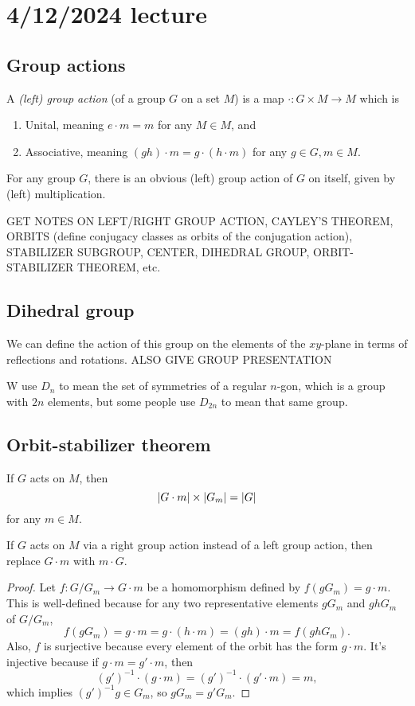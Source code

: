\documentclass[class=article, crop=false]{standalone}
\begin{document}
\section{4/12/2024 lecture}

\subsection{Group actions}
A \emph{(left) group action} (of a group $G$ on a set $M$) is a map $\cdot: G \times M \rightarrow M$ which is
\begin{enumerate}
    \item Unital, meaning $e \cdot m = m$ for any $M \in M$, and
    \item Associative, meaning $(gh)\cdot m = g \cdot (h \cdot m)$ for any $g \in G, m \in M$.
\end{enumerate}
For any group $G$, there is an obvious (left) group action of $G$ on itself, given by (left) multiplication.

GET NOTES ON LEFT/RIGHT GROUP ACTION, CAYLEY'S THEOREM, ORBITS (define conjugacy classes as orbits of the conjugation action), STABILIZER SUBGROUP, CENTER, DIHEDRAL GROUP, ORBIT-STABILIZER THEOREM, etc.

\subsection{Dihedral group}
We can define the action of this group on the elements of the $xy$-plane in terms of reflections and rotations. ALSO GIVE GROUP PRESENTATION
\begin{note}
    W use $D_n$ to mean the set of symmetries of a regular $n$-gon, which is a group with $2n$ elements, but some people use $D_{2n}$ to mean that same group.
\end{note}

\subsection{Orbit-stabilizer theorem}
\begin{thm}
    If $G$ acts on $M$, then
    \[ \left\lvert G \cdot m \right\rvert \times \left\lvert G_m \right\rvert = \left\lvert G \right\rvert \]
    for any $m \in M$.
    \par
    If $G$ acts on $M$ via a right group action instead of a left group action, then replace $G \cdot m$ with $m \cdot G$.
\end{thm}
\begin{proof}
    Let $f: G/G_m \rightarrow G \cdot m$ be a homomorphism defined by $f(gG_m) = g \cdot m$. This is well-defined because for any two representative elements $gG_m$ and $ghG_m$ of $G/G_m$,
    \[ f(gG_m)=g\cdot m = g \cdot (h \cdot m) = (gh) \cdot m = f(ghG_m). \]
    Also, $f$ is surjective because every element of the orbit has the form $g \cdot m$. It's injective because if $g \cdot m = g' \cdot m$, then
    \[ \left( g' \right)^{-1} \cdot (g \cdot m) = \left( g' \right)^{-1} \cdot (g' \cdot m) = m, \]
    which implies $ \left( g' \right)^{-1} g \in G_m$, so $gG_m=g'G_m$.
\end{proof}
\end{document}
